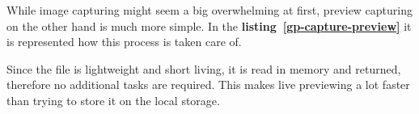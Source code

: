 \vspace{0.3cm}
While image capturing might seem a big overwhelming at first, preview capturing on the other hand is much more simple. In the \textbf{\mbox{listing \ref{gp-capture-preview}}} it is represented how this process is taken care of.



\vspace{0.3cm}
Since the file is lightweight and short living, it is read in memory and returned, therefore no additional tasks are required. This makes live previewing a lot faster than trying to store it on the local storage.
